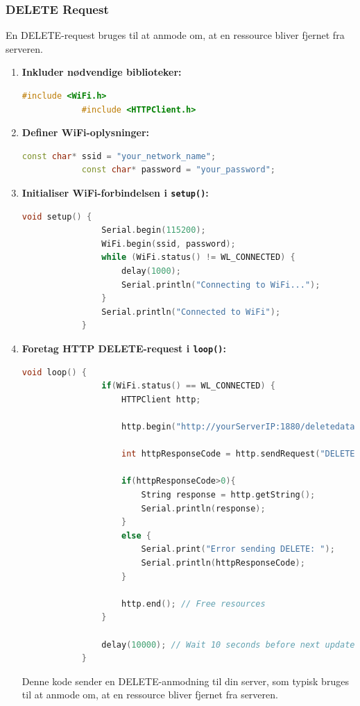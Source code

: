 \documentclass[12pt,a4paper]{book}
\begin{document}
	\subsubsection*{DELETE Request}
	En DELETE-request bruges til at anmode om, at en ressource bliver fjernet fra serveren.
	
	\begin{enumerate}
		\item \textbf{Inkluder nødvendige biblioteker:}
		\begin{lstlisting}[language=C++, caption=Include necessary libraries]
			#include <WiFi.h>
			#include <HTTPClient.h>
		\end{lstlisting}
		
		\item \textbf{Definer WiFi-oplysninger:}
		\begin{lstlisting}[language=C++, caption=Define WiFi credentials]
			const char* ssid = "your_network_name";
			const char* password = "your_password";
		\end{lstlisting}
		
		\item \textbf{Initialiser WiFi-forbindelsen i \texttt{setup()}:}
		\begin{lstlisting}[language=C++, caption=Initialize WiFi connection in setup()]
			void setup() {
				Serial.begin(115200);
				WiFi.begin(ssid, password);
				while (WiFi.status() != WL_CONNECTED) {
					delay(1000);
					Serial.println("Connecting to WiFi...");
				}
				Serial.println("Connected to WiFi");
			}
		\end{lstlisting}
		
		\item \textbf{Foretag HTTP DELETE-request i \texttt{loop()}:}
		\begin{lstlisting}[language=C++, caption=Create HTTP connection in loop()]
			void loop() {
				if(WiFi.status() == WL_CONNECTED) {
					HTTPClient http;
					
					http.begin("http://yourServerIP:1880/deletedata"); // Specify the URL
					
					int httpResponseCode = http.sendRequest("DELETE");
					
					if(httpResponseCode>0){
						String response = http.getString();
						Serial.println(response);
					}
					else {
						Serial.print("Error sending DELETE: ");
						Serial.println(httpResponseCode);
					}
					
					http.end(); // Free resources
				}
				
				delay(10000); // Wait 10 seconds before next update
			}
		\end{lstlisting}
		Denne kode sender en DELETE-anmodning til din server, som typisk bruges til at anmode om, at en ressource bliver fjernet fra serveren.
	\end{enumerate}
	
\end{document}
